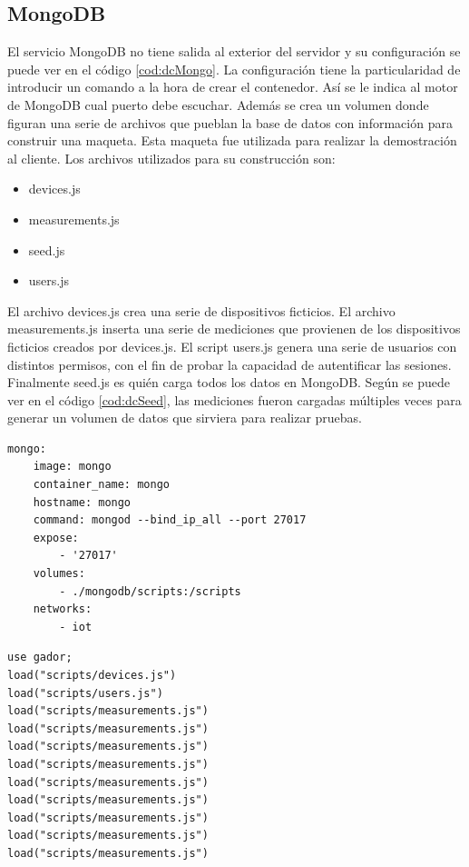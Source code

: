 \subsection{MongoDB}

El servicio MongoDB no tiene salida al exterior del servidor y su configuración se puede ver en el código \ref{cod:dcMongo}.
La configuración tiene la particularidad de introducir un comando a la hora de crear el contenedor.
Así se le indica al motor de MongoDB cual puerto debe escuchar.
Además se crea un volumen donde figuran una serie de archivos que pueblan la base de datos con información para construir una maqueta.
Esta maqueta fue utilizada para realizar la demostración al cliente.
Los archivos utilizados para su construcción son:

\begin{itemize}
	\item devices.js
	\item measurements.js
	\item seed.js
	\item users.js
\end{itemize}

El archivo devices.js crea una serie de dispositivos ficticios.
El archivo measurements.js inserta una serie de mediciones que provienen de los dispositivos ficticios creados por devices.js.
El script users.js genera una serie de usuarios con distintos permisos, con el fin de probar la capacidad de autentificar las sesiones.
Finalmente seed.js es quién carga todos los datos en MongoDB.
Según se puede ver en el código \ref{cod:dcSeed}, las mediciones fueron cargadas múltiples veces para generar un volumen de datos que sirviera para realizar pruebas.

\begin{lstlisting}[label=cod:dcMongo,caption=Orquestación de MongoDB.]
mongo:
	image: mongo
	container_name: mongo
	hostname: mongo
	command: mongod --bind_ip_all --port 27017
	expose: 
		- '27017'
	volumes: 
		- ./mongodb/scripts:/scripts
	networks:
		- iot
\end{lstlisting}

\begin{lstlisting}[label=cod:dcSeed,caption=Seed de la base de datos.]
use gador;
load("scripts/devices.js")
load("scripts/users.js")
load("scripts/measurements.js")
load("scripts/measurements.js")
load("scripts/measurements.js")
load("scripts/measurements.js")
load("scripts/measurements.js")
load("scripts/measurements.js")
load("scripts/measurements.js")
load("scripts/measurements.js")
load("scripts/measurements.js")
\end{lstlisting}

